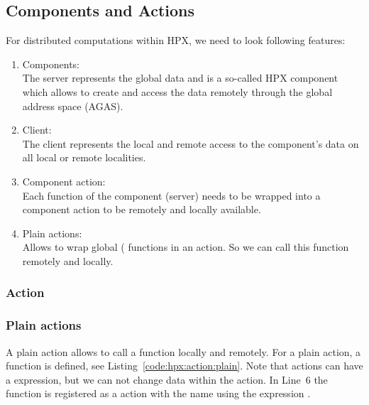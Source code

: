 \subsection{Components and Actions}
\label{sec:hpx:components:actions}
For distributed computations within HPX, we need to look following features:
\begin{enumerate}
\item Components: \\
The server represents the global data and is a so-called HPX component which allows to create and access the data remotely through the global address space (AGAS)\cite{kaiser2014hpx}. 
\item Client: \\
The client represents the local and remote access to the component's data on all local or remote localities. 
\item Component action:\\
Each function of the component (server) needs to be wrapped into a component action to be remotely and locally available.
\item Plain actions: \\
Allows to wrap global ( functions in an action. So we can call this function remotely and locally.
\end{enumerate}



\subsubsection{Action}


\subsubsection{Plain actions}
A plain action allows to call a  function locally and remotely. For a plain action, a  function   is defined, see Listing~\ref{code:hpx:action:plain}. Note that actions can have a  expression, but we can not change data within the action. In Line~6 the function  is registered as a action with the name  using the expression .

